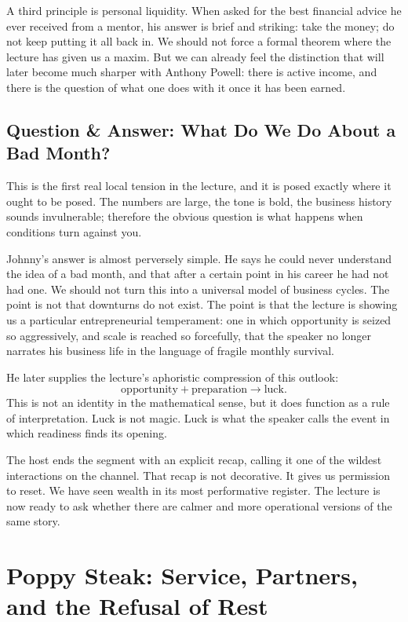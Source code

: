 A third principle is personal liquidity. When asked for the best financial advice he ever received from a mentor, his answer is brief and striking: take the money; do not keep putting it all back in. We should not force a formal theorem where the lecture has given us a maxim. But we can already feel the distinction that will later become much sharper with Anthony Powell: there is active income, and there is the question of what one does with it once it has been earned.

\subsection{Question \& Answer: What Do We Do About a Bad Month?}

This is the first real local tension in the lecture, and it is posed exactly where it ought to be posed. The numbers are large, the tone is bold, the business history sounds invulnerable; therefore the obvious question is what happens when conditions turn against you.

Johnny's answer is almost perversely simple. He says he could never understand the idea of a bad month, and that after a certain point in his career he had not had one. We should not turn this into a universal model of business cycles. The point is not that downturns do not exist. The point is that the lecture is showing us a particular entrepreneurial temperament: one in which opportunity is seized so aggressively, and scale is reached so forcefully, that the speaker no longer narrates his business life in the language of fragile monthly survival.

He later supplies the lecture's aphoristic compression of this outlook:
\begin{equation}
\text{opportunity} + \text{preparation} \longrightarrow \text{luck}.
\end{equation}
This is not an identity in the mathematical sense, but it does function as a rule of interpretation. Luck is not magic. Luck is what the speaker calls the event in which readiness finds its opening.

The host ends the segment with an explicit recap, calling it one of the wildest interactions on the channel. That recap is not decorative. It gives us permission to reset. We have seen wealth in its most performative register. The lecture is now ready to ask whether there are calmer and more operational versions of the same story.

\section{Poppy Steak: Service, Partners, and the Refusal of Rest}

